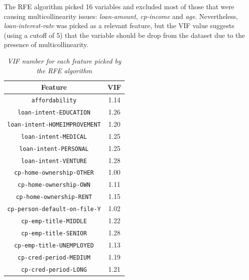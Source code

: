 \documentclass[a4paper,12pt]{article}
\begin{document}
            The RFE algorithm picked 16 variables and excluded most of those that were causing 
            multicollinearity issues: \textit{loan-amount}, \textit{cp-income} and \textit{age}.
            Nevertheless, \textit{loan-interest-rate} was picked as a relevant feature, but the VIF value
            suggests (using a cutoff of 5) that the variable should be drop from the dataset due to the 
            presence of multicollinearity.

            \begin{table}[H]
                \centering
                    \begin{tabular}{|c | c|} 
                        \hline
                            Feature & VIF \\ [0.5ex] 
                            \hline\hline
                            \texttt{affordability} & 1.14 \\
                            \texttt{loan-intent-EDUCATION} & 1.26 \\
                            \texttt{loan-intent-HOMEIMPROVEMENT} & 1.20 \\
                            \texttt{loan-intent-MEDICAL} & 1.25 \\
                            \texttt{loan-intent-PERSONAL} & 1.25 \\
                            \texttt{loan-intent-VENTURE} & 1.28 \\
                            \texttt{cp-home-ownership-OTHER} & 1.00 \\
                            \texttt{cp-home-ownership-OWN} & 1.11 \\
                            \texttt{cp-home-ownership-RENT} & 1.15 \\
                            \texttt{cp-person-default-on-file-Y} & 1.02 \\
                            \texttt{cp-emp-title-MIDDLE} & 1.22 \\
                            \texttt{cp-emp-title-SENIOR} & 1.28 \\
                            \texttt{cp-emp-title-UNEMPLOYED} & 1.13 \\
                            \texttt{cp-cred-period-MEDIUM} & 1.19 \\
                            \texttt{cp-cred-period-LONG} & 1.21 \\ [1ex]
                        \hline
                    \end{tabular}
                    \caption{\textit{VIF number for each feature picked by the RFE algorithm}}
                    \label{table:VIF_RFE_adjusted}
            \end{table}
\end{document}
